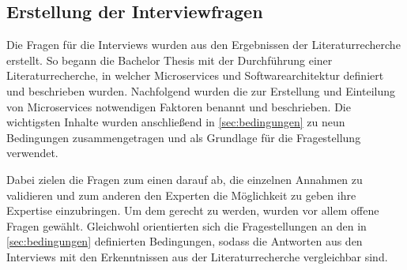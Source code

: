 \subsection{Erstellung der Interviewfragen}

Die Fragen für die Interviews wurden aus den Ergebnissen der Literaturrecherche erstellt. So begann die Bachelor Thesis mit der Durchführung einer Literaturrecherche, in welcher Microservices und Softwarearchitektur definiert und beschrieben wurden. Nachfolgend wurden die zur Erstellung und Einteilung von Microservices notwendigen Faktoren benannt und beschrieben.  Die wichtigsten Inhalte wurden anschließend in \cref{sec:bedingungen} zu neun Bedingungen zusammengetragen und als Grundlage für die Fragestellung verwendet.

Dabei zielen die Fragen zum einen darauf ab, die einzelnen Annahmen zu validieren und zum anderen den Experten die Möglichkeit zu geben ihre Expertise einzubringen. Um dem gerecht zu werden, wurden vor allem offene Fragen gewählt. Gleichwohl orientierten sich die Fragestellungen an den in \cref{sec:bedingungen} definierten Bedingungen, sodass die Antworten aus den Interviews mit den Erkenntnissen aus der Literaturrecherche vergleichbar sind.